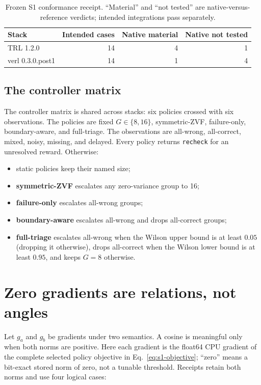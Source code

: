 \begin{table}[h]
  \centering
  \caption{Frozen S1 conformance receipt. ``Material'' and ``not tested'' are
  native-versus-reference verdicts; intended integrations pass separately.}
  \label{tab:s1}
  \begin{tabular}{lrrr}
    \toprule
    Stack & Intended cases & Native material & Native not tested \\
    \midrule
    TRL 1.2.0 & 14 & 4 & 1 \\
    verl 0.3.0.post1 & 14 & 1 & 4 \\
    \bottomrule
  \end{tabular}
\end{table}

\subsection{The controller matrix}

The controller matrix is shared across stacks: six policies crossed with six
observations. The policies are fixed $G\in\{8,16\}$, symmetric-ZVF,
failure-only, boundary-aware, and full-triage. The observations are all-wrong,
all-correct, mixed, noisy, missing, and delayed. Every policy returns
\texttt{recheck} for an unresolved reward. Otherwise:

\begin{itemize}[leftmargin=1.4em,itemsep=2pt]
  \item static policies keep their named size;
  \item \textbf{symmetric-ZVF} escalates any zero-variance group to 16;
  \item \textbf{failure-only} escalates all-wrong groups;
  \item \textbf{boundary-aware} escalates all-wrong and drops all-correct groups;
  \item \textbf{full-triage} escalates all-wrong when the Wilson upper bound is at
  least $0.05$ (dropping it otherwise), drops all-correct when the Wilson lower
  bound is at least $0.95$, and keeps $G=8$ otherwise.
\end{itemize}

\section{Zero gradients are relations, not angles}

Let $g_a$ and $g_b$ be gradients under two semantics. A cosine is meaningful only
when both norms are positive. Here each gradient is the float64 CPU gradient of
the complete selected policy objective in Eq.~\eqref{eq:s1-objective}; ``zero''
means a bit-exact stored norm of zero, not a tunable threshold. Receipts retain
both norms and use four logical cases:


